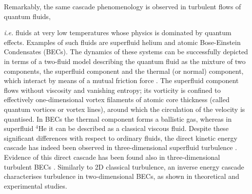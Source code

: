 \documentclass[%
 reprint,
 amsmath,amssymb,
 aps,
 prl,
]{revtex4-2}
\begin{document}
Remarkably, the same cascade phenomenology is observed in turbulent flows 
of quantum fluids, {\textit{i.e.} fluids at very low temperatures whose physics is
dominated by quantum effects.
Examples of such fluids are superfluid helium 
and atomic Bose-Einstein Condensates (BECs). 
The dynamics of these systems can be successfully depicted in terms of 
a two-fluid model \cite{tisza-1938,landau-1949,skrbek-sreenivasan-2012} 
describing the quantum fluid as the mixture of two components, 
the superfluid component and the thermal (or normal) component, which 
interact by means of a mutual friction force 
\cite{jackson-etal-2009,hall-vinen-1956a,hall-vinen-1956b}. 
The superfluid component flows without viscosity and
vanishing entropy; its vorticity is
confined to effectively one-dimensional vortex filaments
of atomic core thickness (called quantum vortices or vortex lines), 
around which the circulation of the velocity is quantised.
In BECs the thermal component forms a ballistic gas,
whereas in superfluid $^4$He it can be described as
a classical viscous fluid.
Despite these significant differences with respect to ordinary fluids, 
the direct
kinetic energy cascade has
indeed been observed in three-dimensional superfluid
turbulence 
\cite{maurer1998,salort2010turbulent,baggaley2012,sherwin-robson2015,Muller_KolmogorovKelvinWave_2020,Muller_IntermittencyVelocityCirculation_2021}.
Evidence of this 
direct
cascade has been found also in
three-dimensional turbulent BECs \cite{middleton-spencer2022}. Similarly to 2D classical turbulence, 
an inverse energy cascade characterises turbulence in two-dimensional BECs, 
as shown in theoretical \cite{bradley2012energy,reeves2013,simula2014emergence,Muller_ExploringEquivalenceTwoDimensional_2024} and experimental \cite{johnstone2019evolution,gauthier2019giant} studies.

}
\end{document}

